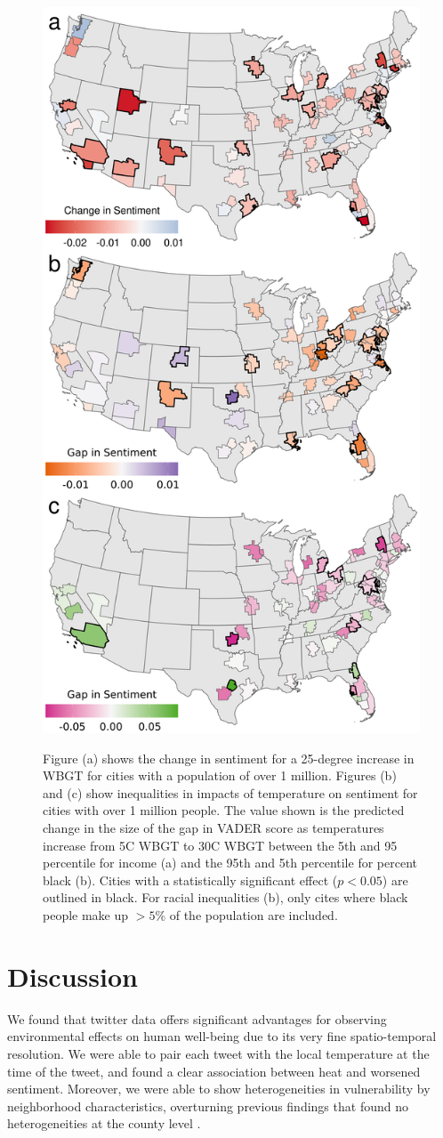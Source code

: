 \documentclass[fleqn,10pt]{wlscirep}
\begin{document}
\begin{figure}[H]
\centering
  \includegraphics[width=0.5\linewidth]{../res/map_combined.png}
  \label{fig:map}
    \caption{Figure (a) shows the change in sentiment for a 25-degree increase in WBGT for cities with a population of over 1 million.  Figures (b) and (c) show inequalities in impacts of temperature on sentiment for cities with over 1 million people.  The value shown is the predicted change in the size of the gap in VADER score as temperatures increase from 5\textdegree C WBGT to 30\textdegree C WBGT between the 5th and 95 percentile for income (a) and the 95th and 5th percentile for percent black (b).  Cities with a statistically significant effect ($p < 0.05$) are outlined in black.  For racial inequalities (b), only cites where black people make up $> 5\%$ of the population are included.}
\end{figure}

\section*{Discussion}
We found that twitter data offers significant advantages for observing environmental effects on human well-being due to its very fine spatio-temporal resolution.  We were able to pair each tweet with the local temperature at the time of the tweet, and found a clear association between heat and worsened sentiment.   Moreover, we were able to show heterogeneities in vulnerability by neighborhood characteristics, overturning previous findings that found no heterogeneities at the county level \cite{Burke2018Aug, Mullins2019Dec}.
\end{document}
